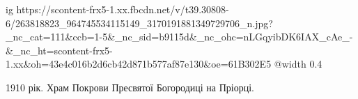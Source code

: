  
 
 
 
 

\ifcmt
  ig https://scontent-frx5-1.xx.fbcdn.net/v/t39.30808-6/263818823_964745534115149_3170191881349729706_n.jpg?_nc_cat=111&ccb=1-5&_nc_sid=b9115d&_nc_ohc=nLGqyibDK6IAX_cAe_-&_nc_ht=scontent-frx5-1.xx&oh=43e4c016b2d6cb42d871b577af87e130&oe=61B302E5
  @width 0.4
\fi

1910 рік. Храм Покрови Пресвятої Богородиці на Пріорці.
